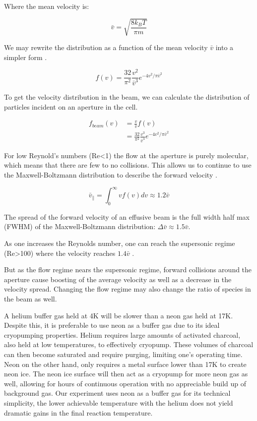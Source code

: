 Where the mean velocity is:

\begin{equation}
	\bar{v} = \sqrt{\frac{8 k_B T}{\pi m}} \label{eq: mb_mean}
\end{equation}

We may rewrite the distribution as a function of the mean velocity $\bar{v}$ into a simpler form .

\begin{equation}
	f(v) = \frac{32}{\pi^2} \frac{v^2}{\bar{v}^3} e^{-4v^2/\pi \bar{v}^2} \label{eq: mb_simplified}
\end{equation}

To get the velocity distribution in the beam, we can calculate the distribution of particles incident on an aperture in the cell.

\begin{align*}
	f_{beam}(v) & = \frac{v}{\bar{v}}f(v)  \\
	& = \frac{32}{\pi^2} \frac{v^3}{\bar{v}^4} e^{-4v^2/\pi \bar{v}^2}
\end{align*}

For low Reynold's numbers (Re<1) the flow at the aperture is purely molecular, which means that there are few to no collisions. This allows us to continue to use the Maxwell-Boltzmann distribution to describe the forward velocity \cite{Hutzler2011c}.

\begin{equation}
	\bar{v}_\parallel = \int_0^\infty v f(v) dv \approx 1.2 \bar{v}
\end{equation}

The spread of the forward velocity of an effusive beam is the full width half max (FWHM) of the Maxwell-Boltzmann distribution: $\Delta\bar{v} \approx 1.5 \bar{v}$.

As one increases the Reynolds number, one can reach the supersonic regime (Re>100) where the velocity reaches $1.4\bar{v}$ \cite{Hutzler2011c}.

But as the flow regime nears the supersonic regime, forward collisions around the aperture cause boosting of the average velocity as well as a decrease in the velocity spread. Changing the flow regime may also change the ratio of species in the beam as well.

A helium buffer gas held at 4K will be slower than a neon gas held at 17K. Despite this, it is preferable to use neon as a buffer gas due to its ideal cryopumping properties. Helium requires large amounts of activated charcoal, also held at low temperatures, to effectively cryopump. These volumes of charcoal can then become saturated and require purging, limiting one's operating time. Neon on the other hand, only requires a metal surface lower than 17K to create neon ice. The neon ice surface will then act as a cryopump for more neon gas as well, allowing for hours of continuous operation with no appreciable build up of background gas. Our experiment uses neon as a buffer gas for its technical simplicity, the lower achievable temperature with the helium does not yield dramatic gains in the final reaction temperature.


